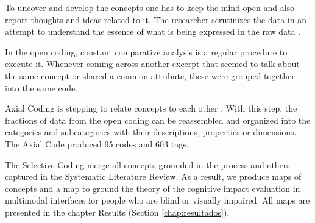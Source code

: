 To uncover and develop the concepts one has to keep the mind open and also report thoughts and ideas related to it. The researcher scrutinizes the data in an attempt to understand the essence of what is being expressed in the raw data \cite{Wuetherick2010}. 

 	\begin{figure}[h] 
   	    \captionsetup{width=13cm}%
	\end{figure}

In the open coding, constant comparative analysis is a regular procedure to execute it. Whenever coming across another excerpt that seemed to talk about the same concept or shared a common attribute, these were grouped together into the same code. 

Axial Coding is stepping to relate concepts to each other \cite{Wuetherick2010}. With this step, the fractions of data from the open coding can be reassembled and organized into the categories and subcategories with their descriptions, properties or dimensions. The Axial Code produced 95 codes and 603 tags. 

The Selective Coding merge all concepts grounded in the process and others captured in the Systematic Literature Review. As a result, we produce maps of concepts and a map to ground the theory of the cognitive impact evaluation in multimodal interfaces for people who are blind or visually impaired. All maps are presented in the chapter Results (Section \ref{chap:resultados}). 
